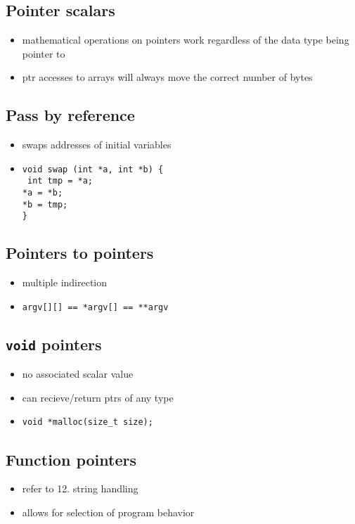 \documentclass[10pt, multicolumn, a4paper]{article}
\begin{document}
\begin{multicols}{2}
	\subsection*{Pointer scalars}
	\begin{itemize}
	\item mathematical operations on pointers work regardless of the data type being pointer to
	\item ptr accesses to arrays will always move the correct number of bytes
	\end{itemize}
	\subsection*{Pass by reference}
	\begin{itemize}
	\item swaps addresses of initial variables
	\item \verb|void swap (int *a, int *b) {| \\ \texttt{\hspace*{5mm} int tmp = *a; \\ \hspace*{5mm}  *a = *b; \\ \hspace*{5mm} *b = tmp;} \\ \verb|}|
	\end{itemize}
	\subsection*{Pointers to pointers}
	\begin{itemize}
	\item multiple indirection
	\item \verb|argv[][] == *argv[] == **argv|
	\end{itemize}
	\subsection*{\texttt{void} pointers}
	\begin{itemize}
	\item no associated scalar value
	\item can recieve/return ptrs of any type
	\item \verb|void *malloc(size_t size);|
	\end{itemize}
	\subsection*{Function pointers}
	\begin{itemize}
	\item refer to 12. string handling
	\item allows for selection of program behavior
	\end{itemize}

\end{multicols}
\end{document}
